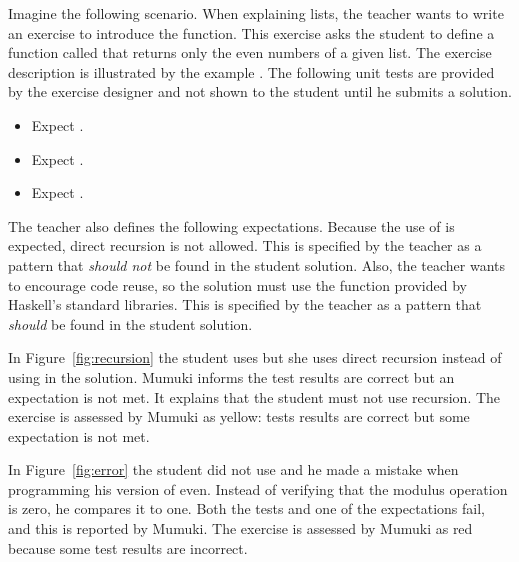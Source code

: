 Imagine the following scenario. When explaining lists, the teacher wants to write an exercise to introduce the  function. This exercise asks the student to define a function called  that returns only the even numbers of a given list. The exercise description is illustrated by the example . 
The following unit tests are provided by the exercise designer and not shown to the student until he submits a solution.
\begin{itemize}[noitemsep,topsep=0pt]
    \item {Expect .}
    \item {Expect .}
    \item {Expect .}
\end{itemize}

The teacher also defines the following expectations. Because the use of  is expected, direct recursion is not allowed. This is specified by the teacher as a pattern that \emph{should not} be found in the student solution. Also, the teacher wants to encourage code reuse, so the solution must use the  function provided by Haskell's standard libraries. This is specified by the teacher as a pattern that \emph{should} be found in the student solution. 

In Figure~\ref{fig:recursion} the student uses  but she uses direct recursion instead of using  in the solution. Mumuki informs the test results are correct but an expectation is not met. It explains that the student must not use recursion. The exercise is assessed by Mumuki as yellow: tests results are correct but some expectation is not met. 

In Figure~\ref{fig:error} the student did not use  and he made a mistake when programming his version of even. Instead of verifying that the modulus operation is zero, he compares it to one. Both the tests and one of the expectations fail, and this is reported by Mumuki. The exercise is assessed by Mumuki as red because some test results are incorrect. 

